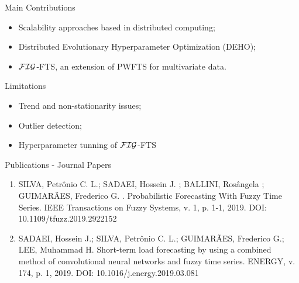 \documentclass{beamer}
\begin{document}
\begin{frame}{Main Contributions}
\begin{itemize}
    \item Scalability approaches based in distributed computing;
    \item Distributed Evolutionary Hyperparameter Optimization (DEHO);
    \item $\mathcal{FIG}$-FTS, an extension of PWFTS for multivariate data. 
\end{itemize}
\end{frame}

\begin{frame}{Limitations}
\begin{itemize}
    \item Trend and non-stationarity issues;
    \item Outlier detection;
    \item Hyperparameter tunning of $\mathcal{FIG}$-FTS
\end{itemize}
\end{frame}


\begin{frame}{Publications - Journal Papers}
\begin{enumerate}
    \item SILVA, Petrônio C. L.; SADAEI, Hossein J. ; BALLINI, Rosângela ; GUIMARÃES, Frederico G. . Probabilistic Forecasting With Fuzzy Time Series. IEEE Transactions on Fuzzy Systems, v. 1, p. 1-1, 2019. DOI: 10.1109/tfuzz.2019.2922152
    \item SADAEI, Hossein J.; SILVA, Petrônio C. L.; GUIMARÃES, Frederico G.; LEE, Muhammad H. Short-term load forecasting by using a combined method of convolutional neural networks and fuzzy time series. ENERGY, v. 174, p. 1, 2019. DOI: 10.1016/j.energy.2019.03.081
\end{enumerate}
\end{frame}
\end{document}
